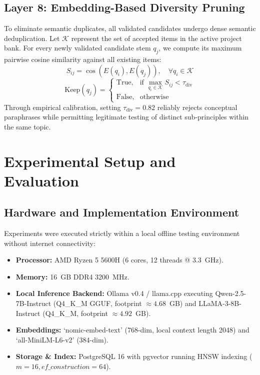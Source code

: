 \documentclass[conference]{IEEEtran}
\begin{document}
\subsection{Layer 8: Embedding-Based Diversity Pruning}
To eliminate semantic duplicates, all validated candidates undergo dense semantic deduplication. Let $\mathcal{K}$ represent the set of accepted items in the active project bank. For every newly validated candidate stem $q_j$, we compute its maximum pairwise cosine similarity against all existing items:
\begin{equation}
S_{ij} = \cos(E(q_i), E(q_j)), \quad \forall q_i \in \mathcal{K}
\end{equation}
\begin{equation}
\text{Keep}(q_j) = \begin{cases} 
\text{True}, & \text{if } \displaystyle\max_{q_i \in \mathcal{K}} S_{ij} < \tau_{\text{div}} \\
\text{False}, & \text{otherwise}
\end{cases}
\end{equation}
Through empirical calibration, setting $\tau_{\text{div}} = 0.82$ reliably rejects conceptual paraphrases while permitting legitimate testing of distinct sub-principles within the same topic.

\section{Experimental Setup and Evaluation}

\subsection{Hardware and Implementation Environment}
Experiments were executed strictly within a local offline testing environment without internet connectivity:
\begin{itemize}
    \item \textbf{Processor:} AMD Ryzen 5 5600H (6 cores, 12 threads @ 3.3~GHz).
    \item \textbf{Memory:} 16~GB DDR4 3200~MHz.
    \item \textbf{Local Inference Backend:} Ollama v0.4 / llama.cpp executing Qwen-2.5-7B-Instruct (Q4\_K\_M GGUF, footprint $\approx 4.68$~GB) and LLaMA-3-8B-Instruct (Q4\_K\_M, footprint $\approx 4.92$~GB).
    \item \textbf{Embeddings:} `nomic-embed-text' (768-dim, local context length 2048) and `all-MiniLM-L6-v2' (384-dim).
    \item \textbf{Storage \& Index:} PostgreSQL 16 with pgvector running HNSW indexing ($m=16, ef\_construction=64$).
\end{itemize}
\end{document}
